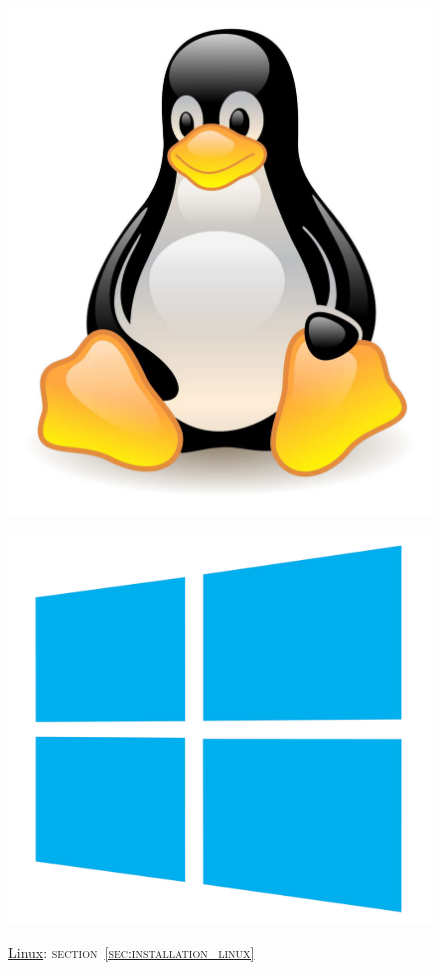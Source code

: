\begin{figure}[!h]
  \centering
  \begin{minipage}{0.32\textwidth}
    \centering
    \hyperref[sec:installation_linux]{\includegraphics[scale=0.05]{Images_formation/LinuxLogo.pdf}}
    \caption*{\underline{Linux}: \textsc{section~\ref{sec:installation_linux}}}
  \end{minipage}
  \begin{minipage}{0.32\textwidth}
    \centering
    \hyperref[sec:installation_windows]{\includegraphics[scale=0.020]{Images_formation/WindowsLogo.pdf}}

\end{minipage}
\end{figure}
